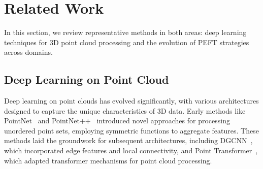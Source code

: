 \section{Related Work}
\label{sec:relatedwork}

In this section, we review representative methods in both areas: deep learning techniques for 3D point cloud processing and the evolution of PEFT strategies across domains.

\subsection{Deep Learning on Point Cloud}

Deep learning on point clouds has evolved significantly, with various architectures designed to capture the unique characteristics of 3D data. Early methods like PointNet~\cite{qi2017pointnet} and PointNet++~\cite{qi2017pointnet++} introduced novel approaches for processing unordered point sets, employing symmetric functions to aggregate features. These methods laid the groundwork for subsequent architectures, including DGCNN~\cite{wang2019dynamic}, which incorporated edge features and local connectivity, and Point Transformer~\cite{zhao2021point}, which adapted transformer mechanisms for point cloud processing.

